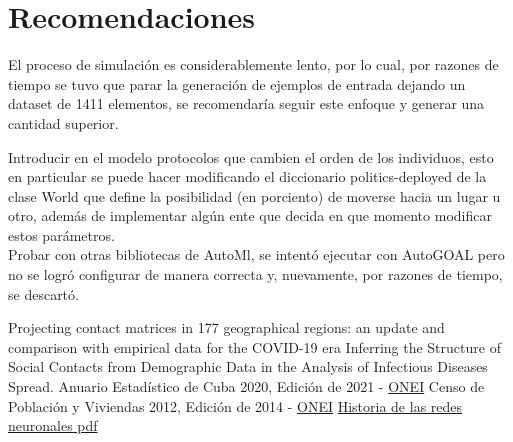 \documentclass{article}
\begin{document}
\section{Recomendaciones}
El proceso de simulación es considerablemente lento, por lo cual, por razones de tiempo se tuvo que parar la generación de ejemplos de entrada dejando un dataset de 1411 elementos, se recomendaría seguir este enfoque y generar una cantidad superior.

Introducir en el modelo protocolos que cambien el orden de los individuos, esto en particular se puede hacer modificando el diccionario politics-deployed de la clase World que define la posibilidad (en porciento) de moverse hacia un lugar u otro, además de implementar algún ente que decida en que momento modificar estos parámetros.\\

Probar con otras bibliotecas de AutoMl, se intentó ejecutar con AutoGOAL pero no se logró configurar de manera correcta y, nuevamente, por razones de tiempo, se descartó. 
\begin{thebibliography}{99}
 Projecting contact matrices in 177 geographical regions: an update and comparison
with empirical data for the COVID-19 era
 Inferring the Structure of Social Contacts from Demographic Data in the Analysis of Infectious Diseases Spread.
 Anuario Estadístico de Cuba 2020, Edición de 2021 -  \href{http://www.onei.gob.cu/node/18491}{ONEI}
 Censo de Población y Viviendas 2012, Edición de 2014
- 
\href{http://www.onei.gob.cu/sites/default/files/informe_nacional_censo_0.rar}{ONEI}
 \href{http://www.itnuevolaredo.edu.mx/takeyas/apuntes/Inteligencia%20Artificial/Apuntes/tareas_alumnos/RNA/Redes%20Neuronales2.pdf }{Historia de las redes neuronales pdf}


\end{thebibliography}
\end{document}
